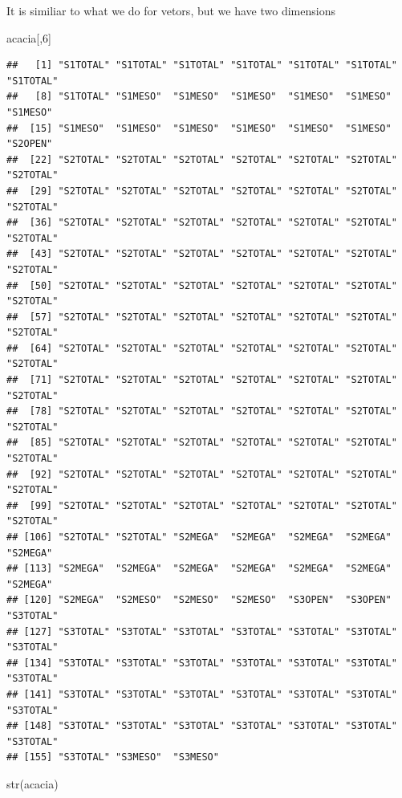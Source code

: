 \documentclass[
]{article}
\newenvironment{Shaded}{\begin{snugshade}}{\end{snugshade}}
\newcommand{\DecValTok}[1]{\textcolor[rgb]{0.00,0.00,0.81}{#1}}
\newcommand{\FunctionTok}[1]{\textcolor[rgb]{0.00,0.00,0.00}{#1}}
\newcommand{\NormalTok}[1]{#1}
\begin{document}
It is similiar to what we do for vetors, but we have two dimensions

\begin{Shaded}
\begin{Highlighting}[]
\NormalTok{acacia[,}\DecValTok{6}\NormalTok{]}
\end{Highlighting}
\end{Shaded}

\begin{verbatim}
##   [1] "S1TOTAL" "S1TOTAL" "S1TOTAL" "S1TOTAL" "S1TOTAL" "S1TOTAL" "S1TOTAL"
##   [8] "S1TOTAL" "S1MESO"  "S1MESO"  "S1MESO"  "S1MESO"  "S1MESO"  "S1MESO" 
##  [15] "S1MESO"  "S1MESO"  "S1MESO"  "S1MESO"  "S1MESO"  "S1MESO"  "S2OPEN" 
##  [22] "S2TOTAL" "S2TOTAL" "S2TOTAL" "S2TOTAL" "S2TOTAL" "S2TOTAL" "S2TOTAL"
##  [29] "S2TOTAL" "S2TOTAL" "S2TOTAL" "S2TOTAL" "S2TOTAL" "S2TOTAL" "S2TOTAL"
##  [36] "S2TOTAL" "S2TOTAL" "S2TOTAL" "S2TOTAL" "S2TOTAL" "S2TOTAL" "S2TOTAL"
##  [43] "S2TOTAL" "S2TOTAL" "S2TOTAL" "S2TOTAL" "S2TOTAL" "S2TOTAL" "S2TOTAL"
##  [50] "S2TOTAL" "S2TOTAL" "S2TOTAL" "S2TOTAL" "S2TOTAL" "S2TOTAL" "S2TOTAL"
##  [57] "S2TOTAL" "S2TOTAL" "S2TOTAL" "S2TOTAL" "S2TOTAL" "S2TOTAL" "S2TOTAL"
##  [64] "S2TOTAL" "S2TOTAL" "S2TOTAL" "S2TOTAL" "S2TOTAL" "S2TOTAL" "S2TOTAL"
##  [71] "S2TOTAL" "S2TOTAL" "S2TOTAL" "S2TOTAL" "S2TOTAL" "S2TOTAL" "S2TOTAL"
##  [78] "S2TOTAL" "S2TOTAL" "S2TOTAL" "S2TOTAL" "S2TOTAL" "S2TOTAL" "S2TOTAL"
##  [85] "S2TOTAL" "S2TOTAL" "S2TOTAL" "S2TOTAL" "S2TOTAL" "S2TOTAL" "S2TOTAL"
##  [92] "S2TOTAL" "S2TOTAL" "S2TOTAL" "S2TOTAL" "S2TOTAL" "S2TOTAL" "S2TOTAL"
##  [99] "S2TOTAL" "S2TOTAL" "S2TOTAL" "S2TOTAL" "S2TOTAL" "S2TOTAL" "S2TOTAL"
## [106] "S2TOTAL" "S2TOTAL" "S2MEGA"  "S2MEGA"  "S2MEGA"  "S2MEGA"  "S2MEGA" 
## [113] "S2MEGA"  "S2MEGA"  "S2MEGA"  "S2MEGA"  "S2MEGA"  "S2MEGA"  "S2MEGA" 
## [120] "S2MEGA"  "S2MESO"  "S2MESO"  "S2MESO"  "S3OPEN"  "S3OPEN"  "S3TOTAL"
## [127] "S3TOTAL" "S3TOTAL" "S3TOTAL" "S3TOTAL" "S3TOTAL" "S3TOTAL" "S3TOTAL"
## [134] "S3TOTAL" "S3TOTAL" "S3TOTAL" "S3TOTAL" "S3TOTAL" "S3TOTAL" "S3TOTAL"
## [141] "S3TOTAL" "S3TOTAL" "S3TOTAL" "S3TOTAL" "S3TOTAL" "S3TOTAL" "S3TOTAL"
## [148] "S3TOTAL" "S3TOTAL" "S3TOTAL" "S3TOTAL" "S3TOTAL" "S3TOTAL" "S3TOTAL"
## [155] "S3TOTAL" "S3MESO"  "S3MESO"
\end{verbatim}

\begin{Shaded}
\begin{Highlighting}[]
\FunctionTok{str}\NormalTok{(acacia)}
\end{Highlighting}
\end{Shaded}
\end{document}
